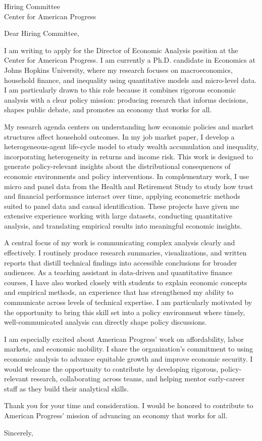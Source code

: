 \documentclass[11pt]{letter}
\begin{document}
\begin{letter}{Hiring Committee \\
Center for American Progress}

\opening{Dear Hiring Committee,}

I am writing to apply for the Director of Economic Analysis position at the Center for American Progress. I am currently a Ph.D. candidate in Economics at Johns Hopkins University, where my research focuses on macroeconomics, household finance, and inequality using quantitative models and micro-level data. I am particularly drawn to this role because it combines rigorous economic analysis with a clear policy mission: producing research that informs decisions, shapes public debate, and promotes an economy that works for all.

My research agenda centers on understanding how economic policies and market structures affect household outcomes. In my job market paper, I develop a heterogeneous-agent life-cycle model to study wealth accumulation and inequality, incorporating heterogeneity in returns and income risk. This work is designed to generate policy-relevant insights about the distributional consequences of economic environments and policy interventions. In complementary work, I use micro and panel data from the Health and Retirement Study to study how trust and financial performance interact over time, applying econometric methods suited to panel data and causal identification. These projects have given me extensive experience working with large datasets, conducting quantitative analysis, and translating empirical results into meaningful economic insights.

A central focus of my work is communicating complex analysis clearly and effectively. I routinely produce research summaries, visualizations, and written reports that distill technical findings into accessible conclusions for broader audiences. As a teaching assistant in data-driven and quantitative finance courses, I have also worked closely with students to explain economic concepts and empirical methods, an experience that has strengthened my ability to communicate across levels of technical expertise. I am particularly motivated by the opportunity to bring this skill set into a policy environment where timely, well-communicated analysis can directly shape policy discussions.

I am especially excited about American Progress’ work on affordability, labor markets, and economic mobility. I share the organization’s commitment to using economic analysis to advance equitable growth and improve economic security. I would welcome the opportunity to contribute by developing rigorous, policy-relevant research, collaborating across teams, and helping mentor early-career staff as they build their analytical skills.

Thank you for your time and consideration. I would be honored to contribute to American Progress’ mission of advancing an economy that works for all.

\closing{Sincerely,}

\end{letter}
\end{document}
